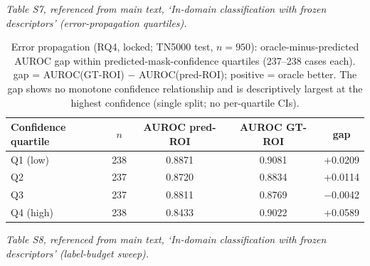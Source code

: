 \documentclass[11pt]{article}
\begin{document}
\noindent\emph{Table S7, referenced from main text, `In-domain classification with frozen descriptors' (error-propagation quartiles).}

\begin{table}[!ht]
\centering\small
\caption{Error propagation (RQ4, locked; TN5000 test, $n{=}950$):
oracle-minus-predicted AUROC gap within predicted-mask-confidence quartiles
(237--238 cases each). gap = AUROC(GT-ROI) $-$ AUROC(pred-ROI); positive =
oracle better. The gap shows no monotone confidence relationship and is
descriptively largest at the highest confidence (single split; no
per-quartile CIs).}
\label{tab:propagation}
\begin{tabular}{lcccc}
\toprule
Confidence quartile & $n$ & AUROC pred-ROI & AUROC GT-ROI & gap \\
\midrule
Q1 (low)  & 238 & 0.8871 & 0.9081 & +0.0209 \\
Q2        & 237 & 0.8720 & 0.8834 & +0.0114 \\
Q3        & 237 & 0.8811 & 0.8769 & $-$0.0042 \\
Q4 (high) & 238 & 0.8433 & 0.9022 & +0.0589 \\
\bottomrule
\end{tabular}
\end{table}

\noindent\emph{Table S8, referenced from main text, `In-domain classification with frozen descriptors' (label-budget sweep).}
\end{document}
